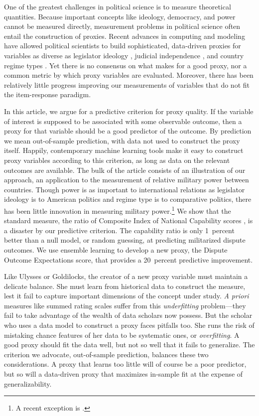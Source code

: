 
One of the greatest challenges in political science is to measure theoretical quantities.
Because important concepts like ideology, democracy, and power cannot be measured directly, measurement problems in political science often entail the construction of proxies.
Recent advances in computing and modeling have allowed political scientists to build sophisticated, data-driven proxies for variables as diverse as legislator ideology \citep{clinton2004}, judicial independence \citep{linzer2014}, and country regime types \citep{jackman2008}.
Yet there is no consensus on what makes for a good proxy, nor a common metric by which proxy variables are evaluated.
Moreover, there has been relatively little progress improving our measurements of variables that do not fit the item-response paradigm.

In this article, we argue for a predictive criterion for proxy quality.
If the variable of interest is supposed to be associated with some observable outcome, then a proxy for that variable should be a good predictor of the outcome.
By prediction we mean out-of-sample prediction, with data not used to construct the proxy itself.
Happily, contemporary machine learning tools make it easy to construct proxy variables according to this criterion, as long as data on the relevant outcomes are available.
The bulk of the article consists of an illustration of our approach, an application to the measurement of relative military power between countries.
Though power is as important to international relations as legislator ideology is to American politics and regime type is to comparative politics, there has been little innovation in measuring military power.\footnote{%
  A recent exception is \citet{Arena:2012}.
}
We show that the standard measure, the ratio of Composite Index of National Capability scores \citep{singer1972}, is a disaster by our predictive criterion.
The capability ratio is only 1~percent better than a null model, or random guessing, at predicting militarized dispute outcomes.
We use ensemble learning to develop a new proxy, the Dispute Outcome Expectations score, that provides a 20~percent predictive improvement.

Like Ulysses or Goldilocks, the creator of a new proxy variable must maintain a delicate balance.
She must learn from historical data to construct the measure, lest it fail to capture important dimensions of the concept under study.
\emph{A priori} measures like summed rating scales suffer from this \emph{underfitting} problem---they fail to take advantage of the wealth of data scholars now possess.
But the scholar who uses a data model to construct a proxy faces pitfalls too.
She runs the risk of mistaking chance features of her data to be systematic ones, or \emph{overfitting}.
A good proxy should fit the data well, but not so well that it fails to generalize.
The criterion we advocate, out-of-sample prediction, balances these two considerations.
A proxy that learns too little will of course be a poor predictor, but so will a data-driven proxy that maximizes in-sample fit at the expense of generalizability.

